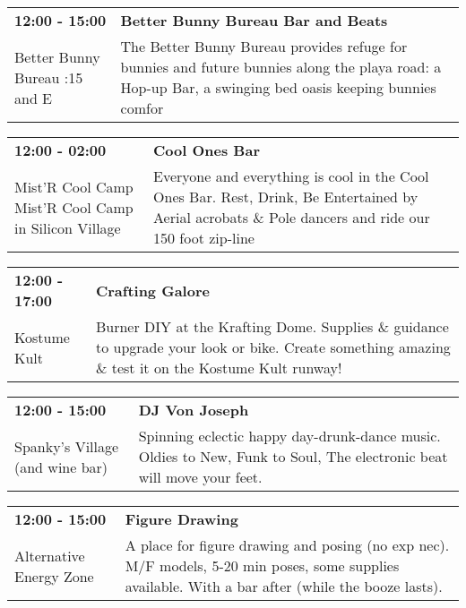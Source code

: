 \begin{tabular}{ p{1in} p{2.2in} }
    \textbf{12:00 - 15:00} & \textbf{Better Bunny Bureau Bar and Beats} \\
    Better Bunny Bureau \newline 4:15 and E & The Better Bunny Bureau provides refuge for bunnies and future bunnies along the playa road: a Hop-up Bar, a swinging bed oasis keeping bunnies comfor \\
    \hline 
\end{tabular}
    
\begin{tabular}{ p{1in} p{2.2in} }
    \textbf{12:00 - 02:00} & \textbf{Cool Ones Bar } \\
    Mist'R Cool Camp \newline Mist'R Cool Camp in Silicon Village & Everyone and everything is cool in the Cool Ones Bar. Rest, Drink, Be Entertained by Aerial acrobats \& Pole dancers and ride our 150 foot zip-line \\
    \hline 
\end{tabular}
    
\begin{tabular}{ p{1in} p{2.2in} }
    \textbf{12:00 - 17:00} & \textbf{Crafting Galore} \\
    Kostume Kult \newline  & Burner DIY at the Krafting Dome. Supplies \& guidance to upgrade your look or bike. Create something amazing \& test it on the Kostume Kult runway! \\
    \hline 
\end{tabular}
    
\begin{tabular}{ p{1in} p{2.2in} }
    \textbf{12:00 - 15:00} & \textbf{DJ Von Joseph} \\
    Spanky's Village (and wine bar) \newline  & Spinning eclectic happy day-drunk-dance music.  Oldies to New, Funk to Soul, The electronic beat will move your feet. \\
    \hline 
\end{tabular}
    
\begin{tabular}{ p{1in} p{2.2in} }
    \textbf{12:00 - 15:00} & \textbf{Figure Drawing} \\
    Alternative Energy Zone \newline  & A place for figure drawing and posing (no exp nec).  M/F models, 5-20 min poses, some supplies available. With a bar after (while the booze lasts). \\
    \hline 
\end{tabular}
    
